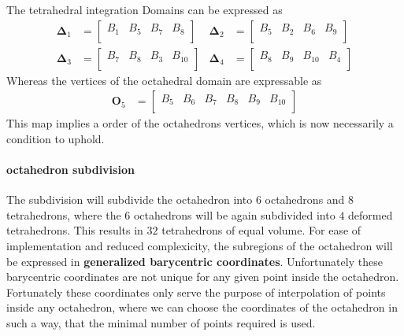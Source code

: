 \documentclass{mitschrift}
\newcommand{\simplex}{\boldsymbol{\Delta}}
\begin{document}
The tetrahedral integration Domains can be expressed as \begin{align}
    \simplex_1 &= \begin{bmatrix}
        B_1 & B_5 & B_7 & B_8 \\
    \end{bmatrix} & \simplex_2 &= \begin{bmatrix}
        B_5 & B_2 & B_6 & B_9 \\
    \end{bmatrix} \\
    \simplex_3 &= \begin{bmatrix}
        B_7 & B_8 & B_3 & B_{10} \\
    \end{bmatrix} & \simplex_4 &= \begin{bmatrix}
        B_8 & B_9 & B_{10} & B_4 \\
    \end{bmatrix}
\end{align}
Whereas the vertices of the octahedral domain are expressable as \begin{align}
    \mathbf{O}_5 &= \begin{bmatrix}
        B_5 & B_6 & B_7 & B_{8} & B_9 & B_{10} \\
    \end{bmatrix}
\end{align}
This map implies a order of the octahedrons vertices, which is now necessarily a condition to uphold.

\paragraph{octahedron subdivision}

The subdivision will subdivide the octahedron into $6$ octahedrons and $8$ tetrahedrons, where the $6$ octahedrons will be 
again subdivided into $4$ deformed tetrahedrons. This results in $32$ tetrahedrons of equal volume.
For ease of implementation and reduced complexicity, the subregions of the octahedron will be expressed in \textbf{generalized barycentric coordinates}.
Unfortunately these barycentric coordinates are not unique for any given point inside the octahedron.
Fortunately these coordinates only serve the purpose of interpolation of points inside any octahedron, where we can choose the coordinates of the octahedron
in such a way, that the minimal number of points required is used.
\end{document}
